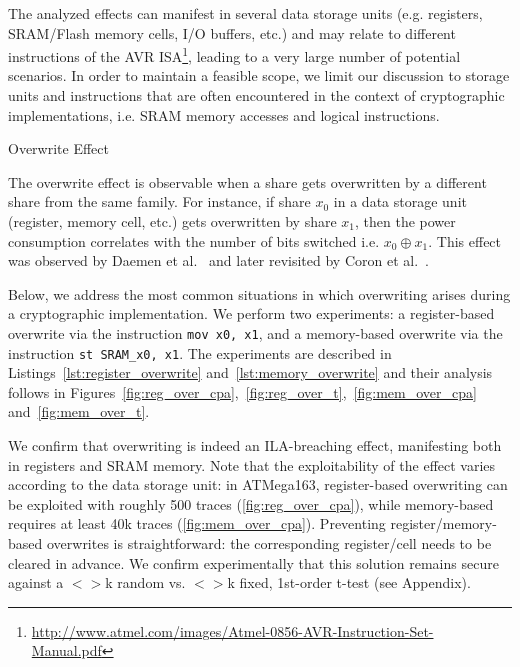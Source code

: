 The analyzed effects can manifest in several data storage units (e.g. registers, SRAM/Flash memory cells, I/O buffers, etc.) and may relate to different instructions of the AVR ISA\footnote{\url{http://www.atmel.com/images/Atmel-0856-AVR-Instruction-Set-Manual.pdf}}, leading to a very large number of potential scenarios. In order to maintain a feasible scope, we limit our discussion to storage units and instructions that are often encountered in the context of cryptographic implementations, i.e. SRAM memory accesses and logical instructions.
\begin{subsection}{Overwrite Effect}\label{overwrite}

The overwrite effect is observable when a share gets overwritten by a different share from the same family. For instance, if share $x_0$ in a data storage unit (register, memory cell, etc.) gets overwritten by share $x_1$, then the power consumption correlates with the number of bits switched i.e. $x_0 \oplus x_1$. This effect was observed by Daemen et al.~\cite{noteonsca} and later revisited by Coron et al.~\cite{DBLP:conf/cosade/CoronGPRRV12}.

Below, we address the most common situations in which overwriting arises during a cryptographic implementation. We perform two experiments: a register-based overwrite via the instruction \texttt{mov x0, x1}, and a memory-based overwrite via the instruction \texttt{st SRAM\_x0,  x1}. The experiments are described in Listings~\ref{lst:register_overwrite} and~\ref{lst:memory_overwrite} and their analysis follows in Figures~\ref{fig:reg_over_cpa},~\ref{fig:reg_over_t},~\ref{fig:mem_over_cpa} and~\ref{fig:mem_over_t}.

We confirm that overwriting is indeed an ILA-breaching effect, manifesting both in registers and SRAM memory. Note that the exploitability of the effect varies according to the data storage unit: in ATMega163, register-based overwriting can be exploited with roughly 500 traces (\ref{fig:reg_over_cpa}), while memory-based requires at least 40k traces (\ref{fig:mem_over_cpa}). Preventing register/memory-based overwrites is straightforward: the corresponding register/cell needs to be cleared in advance. We confirm experimentally that this solution remains secure against a $<>$k random vs. $<>$k fixed, 1st-order t-test (see Appendix).


\end{subsection}
